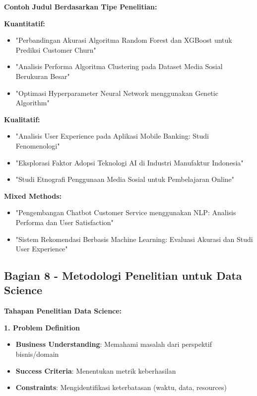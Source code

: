 \textbf{Contoh Judul Berdasarkan Tipe Penelitian:}

\textbf{Kuantitatif:}
\begin{itemize}
    \item "Perbandingan Akurasi Algoritma Random Forest dan XGBoost untuk Prediksi Customer Churn"
    \item "Analisis Performa Algoritma Clustering pada Dataset Media Sosial Berukuran Besar"
    \item "Optimasi Hyperparameter Neural Network menggunakan Genetic Algorithm"
\end{itemize}

\textbf{Kualitatif:}
\begin{itemize}
    \item "Analisis User Experience pada Aplikasi Mobile Banking: Studi Fenomenologi"
    \item "Eksplorasi Faktor Adopsi Teknologi AI di Industri Manufaktur Indonesia"
    \item "Studi Etnografi Penggunaan Media Sosial untuk Pembelajaran Online"
\end{itemize}

\textbf{Mixed Methods:}
\begin{itemize}
    \item "Pengembangan Chatbot Customer Service menggunakan NLP: Analisis Performa dan User Satisfaction"
    \item "Sistem Rekomendasi Berbasis Machine Learning: Evaluasi Akurasi dan Studi User Experience"
\end{itemize}

\subsection*{Bagian 8 - Metodologi Penelitian untuk Data Science}

\textbf{Tahapan Penelitian Data Science:}

\textbf{1. Problem Definition}
\begin{itemize}
    \item \textbf{Business Understanding}: Memahami masalah dari perspektif bisnis/domain
    \item \textbf{Success Criteria}: Menentukan metrik keberhasilan
    \item \textbf{Constraints}: Mengidentifikasi keterbatasan (waktu, data, resources)
\end{itemize}


